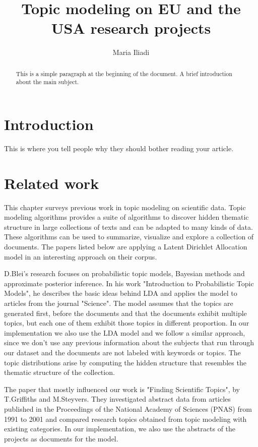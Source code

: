 \documentclass[12pt]{report}
\title{Topic modeling on EU and the USA research projects}
\author{Maria Iliadi}
\begin{document}
\maketitle
\tableofcontents


\begin{abstract}
This is a simple paragraph at the beginning of the document. 
A brief introduction about the main subject.
\end{abstract}


\section{Introduction}
This is where you tell people why they should bother reading your article.

\section{Related work}

This chapter surveys previous work in topic modeling on scientific data. Topic
modeling algorithms provides a suite of algorithms to discover hidden thematic
structure in large collections of texts and can be adapted to many kinds of
data. These algorithms can be used to summarize, visualize and explore a
collection of documents. The papers listed below are applying a Latent Dirichlet
Allocation model in an interesting approach on their corpus.

D.Blei's research focuses on probabilistic topic models, Bayesian methods and
approximate posterior inference. In his work "Introduction to Probabilistic
Topic Models",\cite{Blei11introductionto} he describes the basic ideas behind
LDA and applies the model to articles from the journal "Science". The model
assumes that the topics are generated first, before the documents and that the
documents exhibit multiple topics, but each one of them exhibit those topics in
different proportion. In our implementation we also use the LDA model and we
follow a similar approach, since we don't use any previous information about the
subjects that run through our dataset and the documents are not labeled with
keywords or topics. The topic distributions arise by computing the hidden
structure that resembles the thematic structure of the collection.

The paper that mostly influenced our work is "Finding Scientific Topics", by
T.Griffiths and M.Steyvers.\cite{griffiths_steyvers04} They investigated
abstract data from articles published in the Proceedings of the National Academy
of Sciences (PNAS) from 1991 to 2001 and compared research topics obtained from
topic modeling with existing categories. In our implementation, we also use 
the abstracts of the projects as documents for the model.
\end{document}
